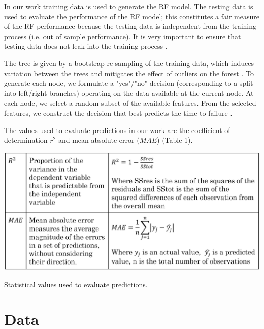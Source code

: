 \documentclass[]{llncs} %
\begin{document}
In our work training data is used to generate the RF model. The testing data is used to evaluate the performance of the RF model; this constitutes a fair measure of the RF performance because the testing data is independent from the training process (i.e. out of sample performance). It is very important to ensure that testing data does not leak into the training process \cite{Bertrand}. \par
The tree is given by a bootstrap re-sampling of the training data, which induces variation between the trees and mitigates the effect of outliers on the forest \cite{Bertrand}. To generate each node, we formulate a "yes"/"no" decision (corresponding to a split into left/right branches) operating on the data available at the current node. At each node, we select a random subset of the available features. From the selected features, we construct the decision that best predicts the time to failure \cite{Bertrand}. \par
The values used to evaluate predictions in our work are the coefficient of determination $r^2$ and mean absolute error ($MAE$) (Table 1). \par
\begin{table}
	\centering
	\includegraphics[width=.9\linewidth]{background}
	\caption{Statistical values used to evaluate predictions.}
	\label{fig:background}
\end{table}

\section{Data} 
\end{document}
